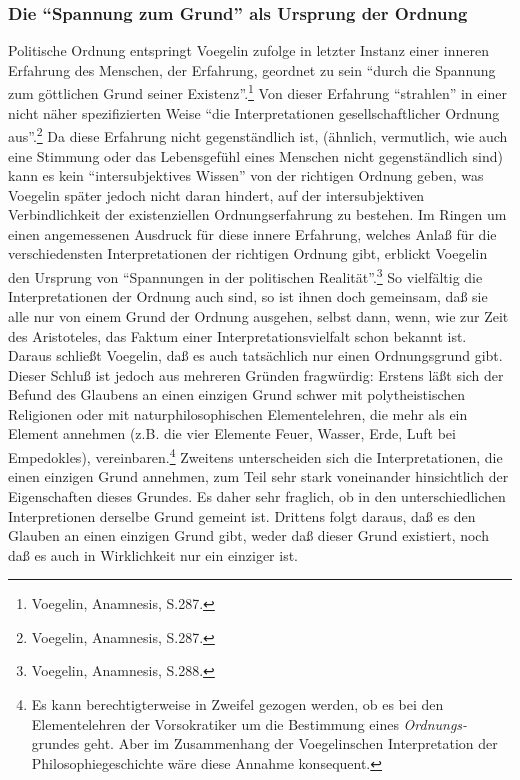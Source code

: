 \subsubsection{Die "`Spannung zum Grund"' als Ursprung der Ordnung}

Politische Ordnung entspringt Voegelin zufolge in letzter Instanz einer
inneren Erfahrung des Menschen, der Erfahrung, geordnet zu sein "`durch
die Spannung zum göttlichen Grund seiner Existenz"'.\footnote{Voegelin,
  Anamnesis, S.287.} Von dieser Erfahrung "`strahlen"' in einer nicht
näher spezifizierten Weise "`die Interpretationen gesellschaftlicher
Ordnung aus"'.\footnote{Voegelin, Anamnesis, S.287.} Da diese Erfahrung
nicht gegenständlich ist, (ähnlich, vermutlich, wie auch eine Stimmung
oder das Lebensgefühl eines Menschen nicht gegenständlich sind) kann es
kein "`intersubjektives Wissen"' von der richtigen Ordnung geben, was
Voegelin später jedoch nicht daran hindert, auf der intersubjektiven
Verbindlichkeit der existenziellen Ordnungserfahrung zu bestehen. Im
Ringen um einen angemessenen Ausdruck für diese innere Erfahrung,
welches Anlaß für die verschiedensten Interpretationen der richtigen
Ordnung gibt, erblickt Voegelin den Ursprung von "`Spannungen in der
politischen Realität"'.\footnote{Voegelin, Anamnesis, S.288.} So
vielfältig die Interpretationen der Ordnung auch sind, so ist ihnen doch
gemeinsam, daß sie alle nur von einem Grund der Ordnung ausgehen, selbst
dann, wenn, wie zur Zeit des Aristoteles, das Faktum einer
Interpretationsvielfalt schon bekannt ist.  Daraus schließt Voegelin,
daß es auch tatsächlich nur einen Ordnungsgrund gibt. Dieser Schluß ist
jedoch aus mehreren Gründen fragwürdig: Erstens läßt sich der Befund des
Glaubens an einen einzigen Grund schwer mit polytheistischen Religionen
oder mit naturphilosophischen Elementelehren, die mehr als ein Element
annehmen (z.B. die vier Elemente Feuer, Wasser, Erde, Luft bei
Empedokles), vereinbaren.\footnote{Es kann berechtigterweise in Zweifel
  gezogen werden, ob es bei den Elementelehren der Vorsokratiker um die
  Bestimmung eines {\it Ordnungs-}grundes geht. Aber im Zusammenhang der
  Voegelinschen Interpretation der Philosophiegeschichte wäre diese
  Annahme konsequent.} Zweitens unterscheiden sich die Interpretationen,
die einen einzigen Grund annehmen, zum Teil sehr stark voneinander
hinsichtlich der Eigenschaften dieses Grundes. Es daher sehr fraglich,
ob in den unterschiedlichen Interpretionen derselbe Grund gemeint ist.
Drittens folgt daraus, daß es den Glauben an einen einzigen Grund gibt,
weder daß dieser Grund existiert, noch daß es auch in Wirklichkeit nur
ein einziger ist.

